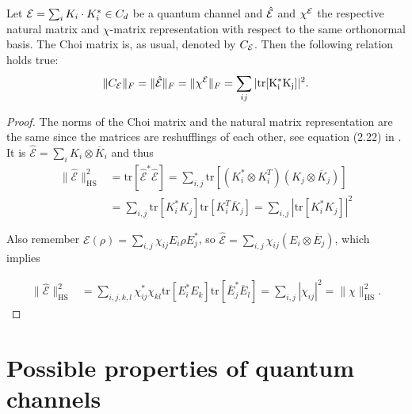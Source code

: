 \begin{prop}\label{prop:relation-norms}
Let $\mathcal E = \sum_i K_i \cdot K_i^* \in C_d$ be a quantum channel and $\hat{\mathcal E}$ and $\chi^{\mathcal E}$ the respective natural matrix and $\chi$-matrix representation with respect to the same orthonormal basis. The Choi matrix is, as usual, denoted by $C_{\mathcal E}$. Then the following relation holds true:
\begin{align*}\lVert C_{\mathcal E}\rVert_F = \lVert\hat{\mathcal E}\rVert_F = \lVert\chi^{\mathcal E}\rVert_F = \sum_{ij}\vert \mathrm{tr[K_i^* K_j]}\vert^2.
\end{align*}
\end{prop}
\begin{proof}
    The norms of the Choi matrix and the natural matrix representation are the same since the matrices are reshufflings of each other, see equation (2.22) in \cite{wolf2012quantum}. It is $\hat{\mathcal{E}} = \sum_i K_i \otimes \overline{K}_i$ and thus
    \begin{align*}
 \|\hat{\mathcal{E}}\|_{\text{HS}}^2 &= \text{tr}[\hat{\mathcal{E}}^* \hat{\mathcal{E}}] = \sum_{i,j} \text{tr}[(K_i^* \otimes K_i^T)(K_j \otimes \overline{K}_j)] \\
&= \sum_{i,j} \text{tr}[K_i^* K_j] \text{tr}[K_i^T \overline{K}_j] = \sum_{i,j} |\text{tr}[K_i^* K_j]|^2
\end{align*}

Also remember $\mathcal{E}(\rho) = \sum_{i,j} \chi_{ij} E_i \rho E_j^*$, so $\hat{\mathcal{E}} = \sum_{i,j} \chi_{ij} (E_i \otimes \overline{E}_j)$, which implies

\begin{align*}
\|\hat{\mathcal{E}}\|_{\text{HS}}^2 &= \sum_{i,j,k,l} \chi_{ij}^* \chi_{kl} \text{tr}[E_i^* E_k] \text{tr}[\overline{E}_j^* \overline{E}_l] = \sum_{i,j} |\chi_{ij}|^2 = \|\chi\|_{\text{HS}}^2.
\end{align*}
\end{proof}
\section{Possible properties of quantum channels}
